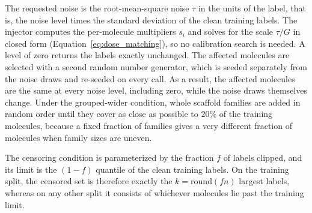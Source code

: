 The requested noise is the root-mean-square noise $\tau$ in the units of the label, that is, the noise level times the standard deviation of the clean training labels. The
injector computes the per-molecule multipliers $s_i$ and solves for the scale $\tau / G$ in closed
form (Equation~\ref{eq:dose_matching}), so no calibration search is needed. A level of zero returns the
labels exactly unchanged. The affected molecules are selected with a second random number generator,
which is seeded separately from the noise draws and re-seeded on every call. As a result, the affected molecules are
the same at every noise level, including zero, while the noise draws themselves change. Under the
grouped-wider condition, whole scaffold families are added in random order until they cover as close as possible
to $20\%$ of the training molecules, because a fixed fraction of families
gives a very different fraction of molecules when family sizes are uneven.

The censoring condition is parameterized by the fraction $f$ of labels clipped, and its limit is the $(1-f)$ quantile
of the clean training labels. On the training split, the censored
set is therefore exactly the $k = \mathrm{round}(fn)$ largest labels, whereas on any other split it consists of whichever
molecules lie past the training limit.

